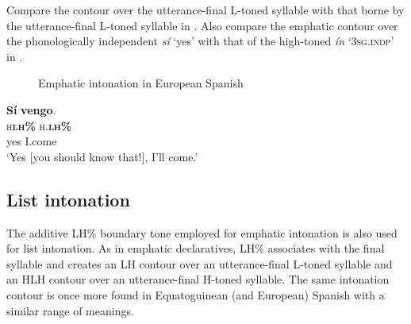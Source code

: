 Compare the contour over the utterance-final L-toned syllable with that borne by the utterance-final L-toned syllable in . Also compare the emphatic contour over the phonologically independent \textit{sí} ‘yes’ with that of the high-toned \textit{ín} ‘\textsc{3sg.indp}’ in .


\begin{figure}
\caption{Emphatic intonation in European Spanish}
\label{fig:key:3.35}
\end{figure}
 


\ea%
    \label{ex:key:88}
    \glll   \textbf{Sí}    \textbf{vengo}.\\
\textsc{h}\textbf{\textsc{lh\%}}  \textsc{h.}\textbf{\textsc{lh\%}}\\
yes    I.come\\
\glt ‘Yes [you should know that!], I’ll come.’
\z

\subsection{List intonation}\label{sec:3.4.3}

The additive LH\% boundary tone employed for emphatic intonation is also used for list intonation. As in emphatic declaratives, LH\% associates with the final syllable and creates an LH contour over an utterance-final L-toned syllable and an HLH contour over an utterance-final H-toned syllable. The same intonation contour is once more found in Equatoguinean (and European) Spanish with a similar range of meanings.


